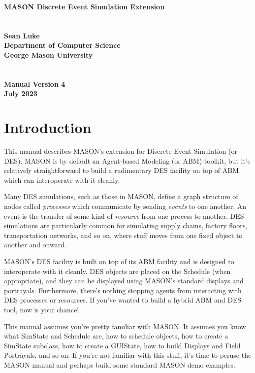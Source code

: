 \documentclass[twoside,10pt]{article}
\newcommand\booktitle{MASON Discrete Event Simulation Extension}
\begin{document}
\noindent\huge\bf \booktitle\\
\\
\\
\Large\bf Sean Luke\\
{\large\rm 
Department of Computer Science\\
George Mason University}
\\
\\
\\
\large\rm {\bf Manual Version 4}\\
\large\rm July 2023\\

\clearpage



\normalsize
\cleardoublepage

\tableofcontents
\clearpage

\section{Introduction}

This manual describes MASON's extension for Discrete Event Simulation (or DES).  MASON is by default an Agent-based Modeling (or ABM) toolkit, but it's relatively straightforward to build a rudimentary DES facility on top of ABM which can interoperate with it cleanly.

Many DES simulations, such as those in MASON, define a graph structure of nodes called {\it processes} which communicate by sending {\it events} to one another.  An event is the transfer of some kind of {\it resource} from one process to another.   DES simulations are particularly common for simulating supply chains, factory floors, transportation networks, and so on, where stuff moves from one fixed object to another and onward.

MASON's DES facility is built on top of its ABM facility and is designed to interoperate with it cleanly.  DES objects are placed on the Schedule (when appropriate), and they can be displayed using MASON's standard displays and portrayals.  Furthermore, there's nothing stopping agents from interacting with DES processes or resources.  If you've wanted to build a hybrid ABM and DES tool, now is your chance!

This manual assumes you're pretty familiar with MASON.  It assumes you know what SimState and Schedule are, how to schedule objects, how to create a SimState subclass, how to create a GUIState, how to build Displays and Field Portrayals, and so on.  If you're not familiar with this stuff, it's time to peruse the MASON manual and perhaps build some standard MASON demo examples.
\end{document}
